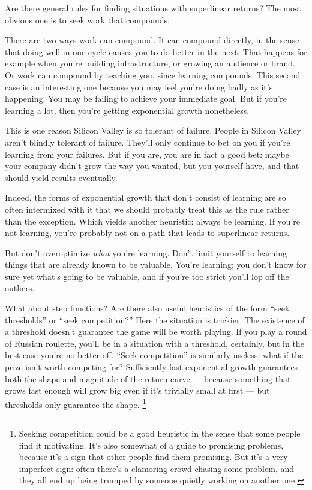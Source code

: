 Are there general rules for finding situations with superlinear returns?
The most obvious one is to seek work that compounds.

There are two ways work can compound. It can compound directly, in the
sense that doing well in one cycle causes you to do better in the next.
That happens for example when you're building infrastructure, or growing
an audience or brand. Or work can compound by teaching you, since
learning compounds. This second case is an interesting one because you
may feel you're doing badly as it's happening. You may be failing to
achieve your immediate goal. But if you're learning a lot, then you're
getting exponential growth nonetheless.

This is one reason Silicon Valley is so tolerant of failure. People in
Silicon Valley aren't blindly tolerant of failure. They'll only continue
to bet on you if you're learning from your failures. But if you are, you
are in fact a good bet: maybe your company didn't grow the way you
wanted, but you yourself have, and that should yield results eventually.

Indeed, the forms of exponential growth that don't consist of learning
are so often intermixed with it that we should probably treat this as
the rule rather than the exception. Which yields another heuristic:
always be learning. If you're not learning, you're probably not on a
path that leads to superlinear returns.

But don't overoptimize \emph{what} you're learning. Don't limit yourself
to learning things that are already known to be valuable. You're
learning; you don't know for sure yet what's going to be valuable, and
if you're too strict you'll lop off the outliers.

What about step functions? Are there also useful heuristics of the form
``seek thresholds'' or ``seek competition?'' Here the situation is
trickier. The existence of a threshold doesn't guarantee the game will
be worth playing. If you play a round of Russian roulette, you'll be in
a situation with a threshold, certainly, but in the best case you're no
better off. ``Seek competition'' is similarly useless; what if the prize
isn't worth competing for? Sufficiently fast exponential growth
guarantees both the shape and magnitude of the return curve --- because
something that grows fast enough will grow big even if it's trivially
small at first --- but thresholds only guarantee the shape.
\footnote{Seeking competition could be a good heuristic in the sense that
some people find it motivating. It's also somewhat of a guide to
promising problems, because it's a sign that other people find them
promising. But it's a very imperfect sign: often there's a clamoring
crowd chasing some problem, and they all end up being trumped by someone
quietly working on another one.}

